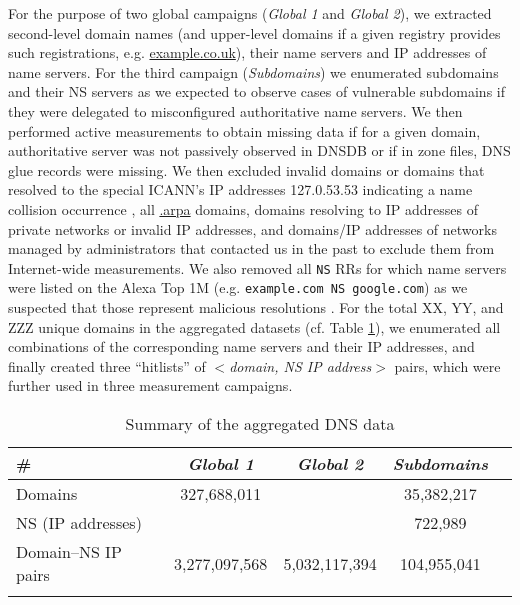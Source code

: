 For the purpose of two global campaigns (\textit{Global 1} and \textit{Global 2}),
we extracted second-level domain names  (and upper-level domains if a given registry provides such registrations, e.g. \url{example.co.uk}), their name servers and IP addresses of name servers. 
For the third campaign (\textit{Subdomains}) we enumerated subdomains and their NS servers as we expected to observe cases of vulnerable subdomains if they were delegated to misconfigured authoritative name servers.
We then performed active measurements to obtain missing data if for a given domain, authoritative server was not passively observed in DNSDB or if in zone files, DNS glue records were missing.
We then excluded invalid domains or domains that resolved to the special ICANN's IP addresses 127.0.53.53 indicating a name collision occurrence \cite{127}, %
all \url{.arpa} domains, domains resolving to IP addresses of private networks or invalid IP addresses, and domains/IP addresses of networks managed by administrators that contacted us in the past to exclude them from Internet-wide measurements. 
We also removed all \texttt{NS} RRs for which name servers were listed on the Alexa Top 1M %
(e.g. \texttt{example.com NS google.com}) as we suspected that those represent malicious resolutions \cite{Dagon,wild}.
%
%
For the total XX, YY, and ZZZ unique domains in the aggregated datasets (cf. Table \ref{tab:data}), we enumerated all combinations of the corresponding name servers and their IP addresses, and finally created three ``hitlists'' of \textit{$<$domain, NS IP address$>$} pairs, which were further used in three measurement campaigns. 






\begin{table}
  \caption{Summary of the aggregated DNS data \label{tab:data}}
 \centering
\begin{tabular}{l*{3}{c}r}
\Xhline{2\arrayrulewidth}
\#  & \textbf{\textit{Global 1}} & \textbf{\textit{Global 2}} & \textbf{\textit{Subdomains}}\\
\hline
Domains & 327,688,011 &  & 35,382,217 \\
NS (IP addresses) &  &  & 722,989 \\
Domain--NS IP pairs & 3,277,097,568 & 5,032,117,394 & 104,955,041\\
\Xhline{2\arrayrulewidth}
 \end{tabular}
\end{table}


